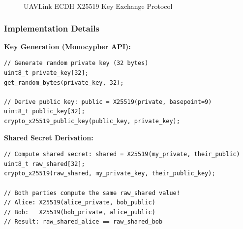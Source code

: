 \documentclass[11pt,a4paper]{article}
\begin{document}
\begin{figure}[H]
\caption{UAVLink ECDH X25519 Key Exchange Protocol}
\end{figure}

\subsubsection{Implementation Details}

\textbf{Key Generation (Monocypher API):}
\begin{lstlisting}
// Generate random private key (32 bytes)
uint8_t private_key[32];
get_random_bytes(private_key, 32);

// Derive public key: public = X25519(private, basepoint=9)
uint8_t public_key[32];
crypto_x25519_public_key(public_key, private_key);
\end{lstlisting}

\textbf{Shared Secret Derivation:}
\begin{lstlisting}
// Compute shared secret: shared = X25519(my_private, their_public)
uint8_t raw_shared[32];
crypto_x25519(raw_shared, my_private_key, their_public_key);

// Both parties compute the same raw_shared value!
// Alice: X25519(alice_private, bob_public)
// Bob:   X25519(bob_private, alice_public)
// Result: raw_shared_alice == raw_shared_bob
\end{lstlisting}
\end{document}
